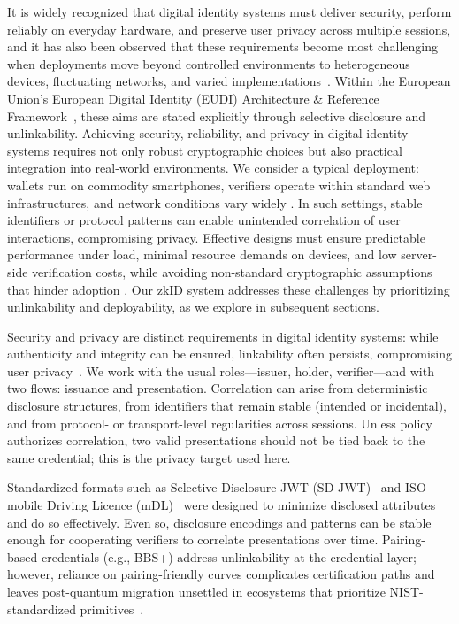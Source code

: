 
It is widely recognized that digital identity systems must deliver security, perform reliably on everyday hardware, and preserve user privacy across multiple sessions, and it has also been observed that these requirements become most challenging when deployments move beyond controlled environments to heterogeneous devices, fluctuating networks, and varied implementations~\cite{PoPETS:KruPaiRujKan24}. Within the European Union’s European Digital Identity (EUDI) Architecture \& Reference Framework~\cite{EU:EUDI23}, these aims are stated explicitly through selective disclosure and unlinkability. Achieving security, reliability, and privacy in digital identity systems requires not only robust cryptographic choices but also practical integration into real-world environments. We consider a typical deployment: wallets run on commodity smartphones, verifiers operate within standard web infrastructures, and network conditions vary widely \cite{EU:EUDI23}. In such settings, stable identifiers or protocol patterns can enable unintended correlation of user interactions, compromising privacy. Effective designs must ensure predictable performance under load, minimal resource demands on devices, and low server-side verification costs, while avoiding non-standard cryptographic assumptions that hinder adoption \cite{NIST:Grassi17}. Our zkID system addresses these challenges by prioritizing unlinkability and deployability, as we explore in subsequent sections.

Security and privacy are distinct requirements in digital identity systems: while authenticity and integrity can be ensured, linkability often persists, compromising user privacy~\cite{PoPETS:KruPaiRujKan24,JC:FeiFiaSha88}. We work with the usual roles—issuer, holder, verifier—and with two flows: issuance and presentation. Correlation can arise from deterministic disclosure structures, from identifiers that remain stable (intended or incidental), and from protocol- or transport-level regularities across sessions. Unless policy authorizes correlation, two valid presentations should not be tied back to the same credential; this is the privacy target used here.

Standardized formats such as Selective Disclosure JWT (SD-JWT)~ \cite{IETF:FetYasCam25} and ISO mobile Driving Licence (mDL)~\cite{ISO:18013-5} were designed to minimize disclosed attributes and do so effectively. Even so, disclosure encodings and patterns can be stable enough for cooperating verifiers to correlate presentations over time. Pairing-based credentials (e.g., BBS+\cite{C:BCTV14}) address unlinkability at the credential layer; however, reliance on pairing-friendly curves complicates certification paths and leaves post-quantum migration unsettled in ecosystems that prioritize NIST-standardized primitives~\cite{EC:TesZhu23b}.

